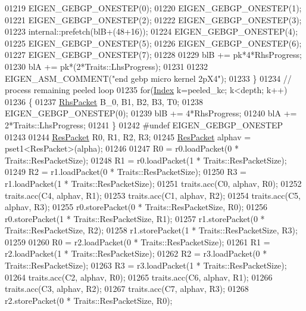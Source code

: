 \begin{DoxyCode}
01219             EIGEN\_GEBGP\_ONESTEP(0);
01220             EIGEN\_GEBGP\_ONESTEP(1);
01221             EIGEN\_GEBGP\_ONESTEP(2);
01222             EIGEN\_GEBGP\_ONESTEP(3);
01223             internal::prefetch(blB+(48+16));
01224             EIGEN\_GEBGP\_ONESTEP(4);
01225             EIGEN\_GEBGP\_ONESTEP(5);
01226             EIGEN\_GEBGP\_ONESTEP(6);
01227             EIGEN\_GEBGP\_ONESTEP(7);
01228 
01229             blB += pk*4*RhsProgress;
01230             blA += pk*(2*Traits::LhsProgress);
01231 
01232             EIGEN\_ASM\_COMMENT(\textcolor{stringliteral}{"end gebp micro kernel 2pX4"});
01233           \}
01234           \textcolor{comment}{// process remaining peeled loop}
01235           \textcolor{keywordflow}{for}(\hyperlink{namespace_eigen_a62e77e0933482dafde8fe197d9a2cfde}{Index} k=peeled\_kc; k<depth; k++)
01236           \{
01237             \hyperlink{class_eigen_1_1internal_1_1_tensor_lazy_evaluator_writable}{RhsPacket} B\_0, B1, B2, B3, T0;
01238             EIGEN\_GEBGP\_ONESTEP(0);
01239             blB += 4*RhsProgress;
01240             blA += 2*Traits::LhsProgress;
01241           \}
01242 \textcolor{preprocessor}{#undef EIGEN\_GEBGP\_ONESTEP}
01243 
01244           \hyperlink{class_eigen_1_1internal_1_1_tensor_lazy_evaluator_writable}{ResPacket} R0, R1, R2, R3;
01245           \hyperlink{class_eigen_1_1internal_1_1_tensor_lazy_evaluator_writable}{ResPacket} alphav = pset1<ResPacket>(alpha);
01246 
01247           R0 = r0.loadPacket(0 * Traits::ResPacketSize);
01248           R1 = r0.loadPacket(1 * Traits::ResPacketSize);
01249           R2 = r1.loadPacket(0 * Traits::ResPacketSize);
01250           R3 = r1.loadPacket(1 * Traits::ResPacketSize);
01251           traits.acc(C0, alphav, R0);
01252           traits.acc(C4, alphav, R1);
01253           traits.acc(C1, alphav, R2);
01254           traits.acc(C5, alphav, R3);
01255           r0.storePacket(0 * Traits::ResPacketSize, R0);
01256           r0.storePacket(1 * Traits::ResPacketSize, R1);
01257           r1.storePacket(0 * Traits::ResPacketSize, R2);
01258           r1.storePacket(1 * Traits::ResPacketSize, R3);
01259 
01260           R0 = r2.loadPacket(0 * Traits::ResPacketSize);
01261           R1 = r2.loadPacket(1 * Traits::ResPacketSize);
01262           R2 = r3.loadPacket(0 * Traits::ResPacketSize);
01263           R3 = r3.loadPacket(1 * Traits::ResPacketSize);
01264           traits.acc(C2,  alphav, R0);
01265           traits.acc(C6,  alphav, R1);
01266           traits.acc(C3,  alphav, R2);
01267           traits.acc(C7,  alphav, R3);
01268           r2.storePacket(0 * Traits::ResPacketSize, R0);

\end{DoxyCode}
